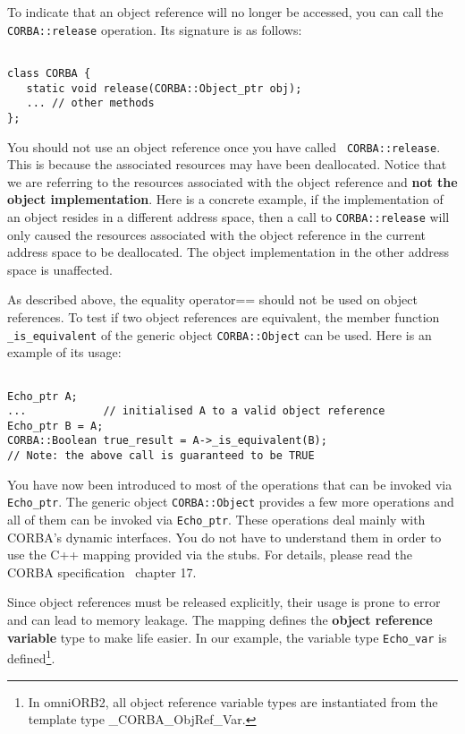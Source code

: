 \documentclass[11pt,twoside,onecolumn]{book}
\begin{document}
To indicate that an object reference will no longer be accessed, you can
call the {\tt CORBA::release} operation. Its signature is as follows:

{\small
\begin{verbatim}

class CORBA {
   static void release(CORBA::Object_ptr obj);
   ... // other methods
};
\end{verbatim}
}

You should not use an object reference once you have called {\tt
CORBA::release}. This is because the associated resources may have been
deallocated. Notice that we are referring to the resources associated with
the object reference and {\bf not the object implementation}. Here is a
concrete example, if the implementation of an object resides in a different
address space, then a call to {\tt CORBA::release} will only caused the
resources associated with the object reference in the current address space
to be deallocated. The object implementation in the other address space is
unaffected.

As described above, the equality operator== should not be used on object
references. To test if two object references are equivalent, the member
function {\tt \_is\_equivalent} of the generic object {\tt CORBA::Object}
can be used. Here is an example of its usage:

{\small
\begin{verbatim}

Echo_ptr A;
...            // initialised A to a valid object reference 
Echo_ptr B = A;
CORBA::Boolean true_result = A->_is_equivalent(B); 
// Note: the above call is guaranteed to be TRUE

\end{verbatim}
}

You have now been introduced to most of the operations that can be invoked
via {\tt Echo\_ptr}. The generic object {\tt CORBA::Object} provides a few more
operations and all of them can be invoked via {\tt Echo\_ptr}. These operations
deal mainly with CORBA's dynamic interfaces. You do not have to understand
them in order to use the C++ mapping provided via the stubs. For details,
please read the CORBA specification~\cite{corba2-spec} chapter 17.

Since object references must be released explicitly, their usage is prone
to error and can lead to memory leakage. The mapping defines the {\bf
object reference variable} type to make life easier. In our example, the
variable type {\tt Echo\_var} is defined\footnote{In omniORB2, all object
reference variable types are instantiated from the template type
\_CORBA\_ObjRef\_Var.}.
\end{document}
